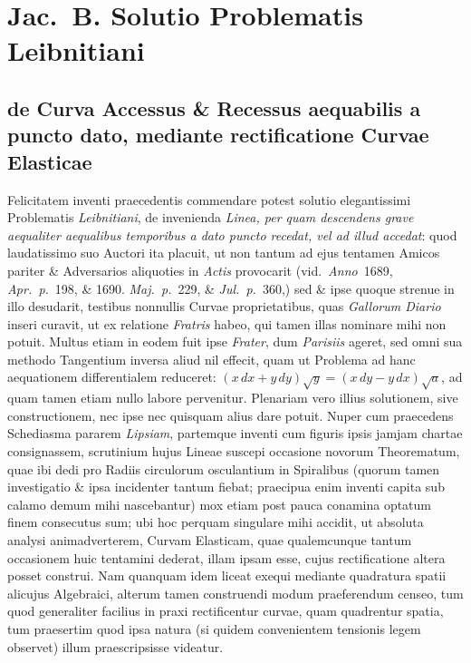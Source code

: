 \documentclass{article}
\begin{document}
\section*{Jac.\ B. Solutio Problematis Leibnitiani}
\subsection*{de Curva Accessus \& Recessus aequabilis a puncto dato, mediante rectificatione Curvae Elasticae}

Felicitatem inventi praecedentis commendare potest solutio elegantissimi Problematis
\emph{Leibnitiani}, de invenienda \emph{Linea, per quam descendens grave aequaliter aequalibus
temporibus a dato puncto recedat, vel ad illud accedat}: quod laudatissimo suo Auctori ita placuit,
ut non tantum ad ejus tentamen Amicos pariter \& Adversarios aliquoties in \emph{Actis} provocarit
(vid.\ \emph{Anno}~1689, \emph{Apr.\ p.}~198, \& 1690. \emph{Maj.\ p.}~229, \& \emph{Jul.\ p.}~360,)
sed \& ipse quoque strenue in illo desudarit, testibus nonnullis Curvae proprietatibus, quas
\emph{Gallorum Diario} inseri curavit, ut ex relatione \emph{Fratris} habeo, qui tamen illas nominare
mihi non potuit. Multus etiam in eodem fuit ipse \emph{Frater}, dum \emph{Parisiis} ageret, sed omni
sua methodo Tangentium inversa aliud nil effecit, quam ut Problema ad hanc aequationem differentialem
reduceret: $(x\,dx + y\,dy)\sqrt{y} = (x\,dy - y\,dx)\sqrt{a}$, ad quam tamen etiam nullo labore
pervenitur. Plenariam vero illius solutionem, sive constructionem, nec ipse nec quisquam alius dare
potuit. Nuper cum praecedens Schediasma pararem \emph{Lipsiam}, partemque inventi cum figuris ipsis
jamjam chartae consignassem, scrutinium hujus Lineae suscepi occasione novorum Theorematum, quae ibi
dedi pro Radiis circulorum osculantium in Spiralibus (quorum tamen investigatio \& ipsa incidenter
tantum fiebat; praecipua enim inventi capita sub calamo demum mihi nascebantur) mox etiam post pauca
conamina optatum finem consecutus sum; ubi hoc perquam singulare mihi accidit, ut absoluta analysi
animadverterem, Curvam Elasticam, quae qualemcunque tantum occasionem huic tentamini dederat, illam
ipsam esse, cujus rectificatione altera posset construi. Nam quanquam idem liceat exequi mediante
quadratura spatii alicujus Algebraici, alterum tamen construendi modum praeferendum censeo, tum quod
generaliter facilius in praxi rectificentur curvae, quam quadrentur spatia, tum praesertim quod ipsa
natura (si quidem convenientem tensionis legem observet) illum praescripsisse videatur.
\end{document}
